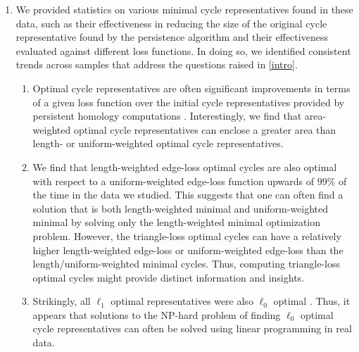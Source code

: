 \begin{enumerate}
    \item We provided statistics on various minimal cycle representatives found in these data, such as their effectiveness in reducing the size of the original cycle representative found by the persistence algorithm and their effectiveness evaluated against different loss functions. In doing so, we identified consistent trends across samples that address the questions raised in \se \ref{intro}.
    \begin{enumerate}
        \item Optimal cycle representatives are often significant improvements in terms of a given loss function over the initial cycle representatives provided by persistent homology computations \DIFaddbegin {}\DIFaddend . Interestingly, we find that area-weighted \DIFdelbegin {}\DIFdelend \DIFaddbegin {}\DIFaddend optimal cycle representatives can enclose a greater area than length- or uniform-weighted optimal cycle representatives.  
        \item We find that length-weighted edge-loss optimal cycles are also optimal with respect to a uniform-weighted edge-loss function upwards of $99\%$ of the time in the data we studied. This suggests that one can often find a solution that is both length-weighted minimal and uniform-weighted minimal by solving only the length-weighted minimal optimization problem. However, the triangle-loss optimal cycles can have a relatively higher length-weighted edge-loss or uniform-weighted edge-loss than the length/uniform-weighted minimal cycles. Thus, computing triangle-loss optimal cycles might provide distinct information and insights. 
        \item Strikingly, all \DIFaddbegin {}\DIFaddend $\ell_1$ optimal representatives \DIFdelbegin {}\DIFdelend were also $\ell_0$ optimal \DIFaddbegin {}\DIFaddend . Thus, it appears that solutions to the NP-hard problem of finding $\ell_0$ optimal cycle representatives can often be solved using linear programming in real data.  \DIFaddbegin {}\DIFaddend \end{enumerate}


\end{enumerate}
